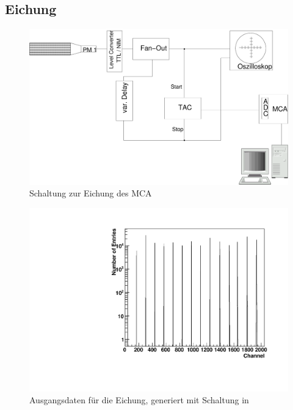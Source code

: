 
\subsection{Eichung}

\begin{figure}[ht!]
  \centering
  \includegraphics[width=\columnwidth,keepaspectratio=true]{zeit_schaltung}
  \caption{Schaltung zur Eichung des MCA}
  \label{fig:zeit_schaltung}
\end{figure}

\begin{figure}[ht!]
  \centering
  \includegraphics[width=\columnwidth,keepaspectratio=true]{eichung}
  \caption{Ausgangsdaten für die Eichung, generiert mit Schaltung in }
  \label{fig:eichung}
\end{figure}

